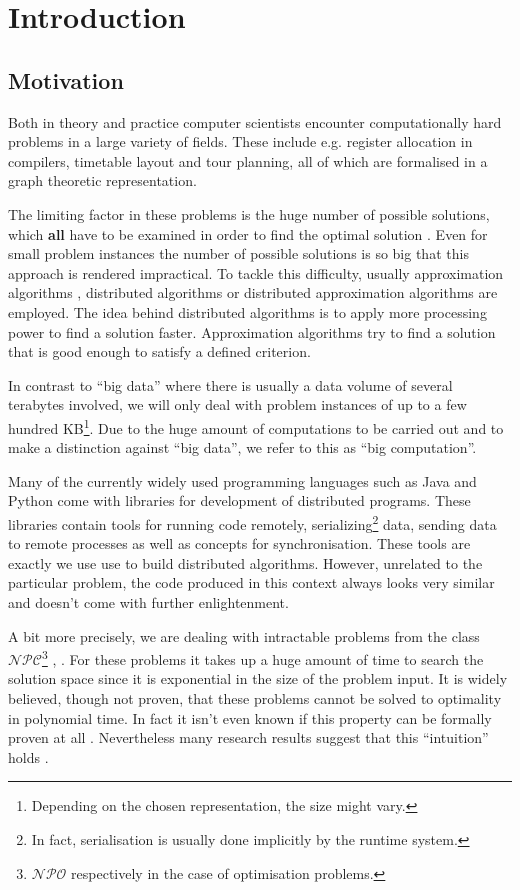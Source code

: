 \chapter{Introduction}

\section{Motivation}
Both in theory and practice computer scientists encounter computationally hard problems in a large variety of fields. These include e.g. register allocation in compilers, timetable layout and tour planning, all of which are formalised in a graph theoretic \cite{} representation.

The limiting factor in these problems is the huge number of possible solutions, which \textbf{all} have to be examined in order to find the optimal solution \cite{Garey:1979:CIG:578533}. Even for small problem instances the number of possible solutions is so big that this approach is rendered impractical. To tackle this difficulty, usually approximation algorithms \cite{}, distributed algorithms or distributed approximation algorithms are employed. The idea behind distributed algorithms is to apply more processing power to find a solution faster. Approximation algorithms try to find a solution that is good enough to satisfy a defined criterion.

In contrast to \enquote{big data} where there is usually a data volume of several terabytes involved, we will only deal with problem instances of up to a few hundred KB\footnote{Depending on the chosen representation, the size might vary.}. Due to the huge amount of computations to be carried out and to make a distinction against \enquote{big data}, we refer to this as \enquote{big computation}.

Many of the currently widely used programming languages such as Java and Python come with libraries for development of distributed programs. These libraries contain tools for running code remotely, serializing\footnote{In fact, serialisation is usually done implicitly by the runtime system.} data, sending data to remote processes as well as concepts for synchronisation. These tools are exactly we use use to build distributed algorithms. However, unrelated to the particular problem, the code produced in this context always looks very similar and doesn't come with further enlightenment.

A bit more precisely, we are dealing with intractable problems from the class $\mathcal{NPC}$\footnote{$\mathcal{NPO}$ respectively in the case of optimisation problems.} \cite{Garey:1979:CIG:578533}, \cite{Hopcroft:2006:IAT:1196416}. For these problems it takes up a huge amount of time to search the solution space since it is exponential in the size of the problem input. It is widely believed, though not proven, that these problems cannot be solved to optimality in polynomial time. In fact it isn't even known if this property can be formally proven at all \cite{}. Nevertheless many research results suggest that this \enquote{intuition} holds \cite{} \cite{} \cite{}.

